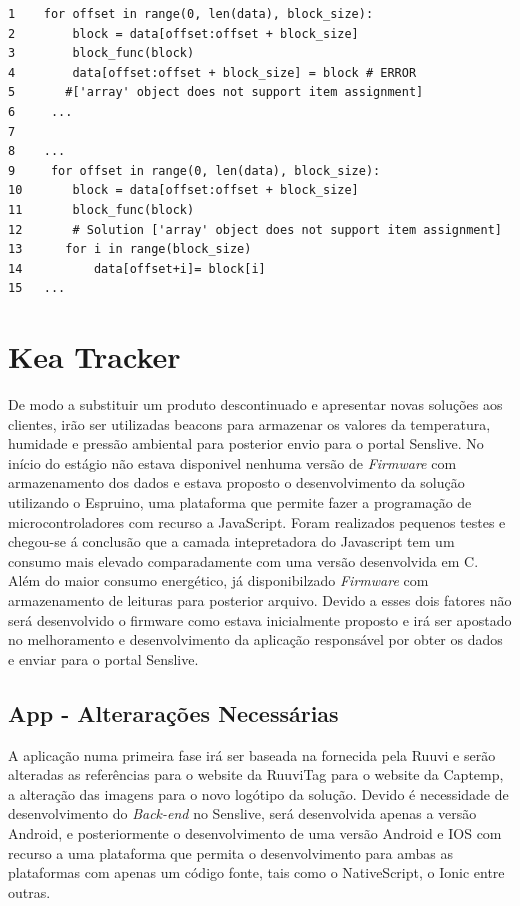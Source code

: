 \begin{verbatim}
1    for offset in range(0, len(data), block_size):
2        block = data[offset:offset + block_size]
3        block_func(block)
4        data[offset:offset + block_size] = block # ERROR 
5       #['array' object does not support item assignment]
6     ...
7
8    ...
9     for offset in range(0, len(data), block_size):
10       block = data[offset:offset + block_size]
11       block_func(block)
12       # Solution ['array' object does not support item assignment]
13      for i in range(block_size)
14          data[offset+i]= block[i]
15   ...
 \end{verbatim}

\section {Kea Tracker}

\par De modo a substituir um produto descontinuado e apresentar novas soluções aos clientes, irão ser utilizadas beacons para armazenar os valores da temperatura, humidade e pressão ambiental para posterior envio para o portal Senslive. No início do estágio não estava disponivel nenhuma versão de \textit{Firmware} com armazenamento dos dados e estava proposto o desenvolvimento da solução utilizando o Espruino, uma plataforma que permite fazer a programação de microcontroladores com recurso a JavaScript. Foram realizados pequenos testes e chegou-se á conclusão que a camada intepretadora do Javascript tem um consumo mais elevado comparadamente com uma versão desenvolvida em C. Além do maior consumo energético, já disponibilzado \textit{Firmware} com armazenamento de leituras para posterior arquivo. Devido a esses dois fatores não será desenvolvido o firmware como estava inicialmente proposto e irá ser apostado no melhoramento e desenvolvimento da aplicação responsável por obter os dados e enviar para o portal Senslive. 

\subsection{App - Alterarações Necessárias}

\par A aplicação numa primeira fase irá ser baseada na fornecida pela Ruuvi e serão alteradas as referências para o website da RuuviTag para o website da Captemp, a alteração das imagens para o novo logótipo da solução. Devido é necessidade de desenvolvimento do \textit{Back-end} no Senslive, será desenvolvida apenas a versão Android, e posteriormente o desenvolvimento de uma versão Android e IOS com recurso a uma plataforma que permita o desenvolvimento para ambas as plataformas com apenas um código fonte, tais como o NativeScript\cite{nativescript}, o Ionic\cite{ionic} entre outras.

